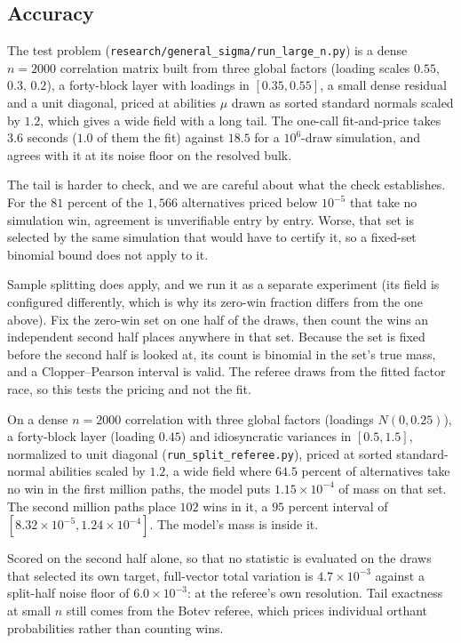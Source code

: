 \documentclass[11pt]{article}
\begin{document}
\subsection{Accuracy}
The test problem (\texttt{research/general\_sigma/run\_large\_n.py}) is a
dense $n=2000$ correlation matrix built from three global factors
(loading scales $0.55$, $0.3$, $0.2$), a forty-block layer with loadings
in $[0.35,0.55]$, a small dense residual and a unit diagonal, priced at
abilities $\mu$ drawn as sorted standard normals scaled by $1.2$, which
gives a wide field with a long tail. The one-call fit-and-price takes $3.6$
seconds ($1.0$ of them the fit) against $18.5$ for a $10^6$-draw
simulation, and agrees with it at its noise floor on the resolved bulk.

The tail is harder to check, and we are careful about what the check
establishes. For the $81$ percent of the $1{,}566$ alternatives priced below $10^{-5}$
that take no simulation win, agreement is unverifiable entry by entry. Worse, that set is
selected by the same simulation that would have to certify it, so a
fixed-set binomial bound does not apply to it.

Sample splitting does apply, and we run it as a separate experiment
(its field is configured differently, which is why its zero-win fraction
differs from the one above). Fix the zero-win set on one
half of the draws, then count the wins an independent second half places
anywhere in that set. Because the set is fixed before the second half is
looked at, its count is binomial in the set's true mass, and a
Clopper--Pearson interval is valid. The referee draws from the fitted
factor race, so this tests the pricing and not the fit.

On a dense $n=2000$ correlation with three global factors (loadings
$N(0,0.25)$), a forty-block layer (loading $0.45$) and idiosyncratic
variances in $[0.5,1.5]$, normalized to unit diagonal
(\texttt{run\_split\_referee.py}), priced at sorted standard-normal
abilities scaled by $1.2$, a wide field where $64.5$ percent of
alternatives take no win in the first million paths, the model puts
$1.15\times10^{-4}$ of mass on that set. The second million paths place
$102$ wins in it, a $95$ percent interval of
$[8.32\times10^{-5},1.24\times10^{-4}]$. The model's mass is inside it.

Scored on the second half alone, so that no statistic is evaluated on the
draws that selected its own target, full-vector total variation is
$4.7\times10^{-3}$ against a split-half noise floor of $6.0\times10^{-3}$:
at the referee's own resolution. Tail exactness at small $n$ still comes
from the Botev referee, which prices individual orthant probabilities
rather than counting wins.
\end{document}
